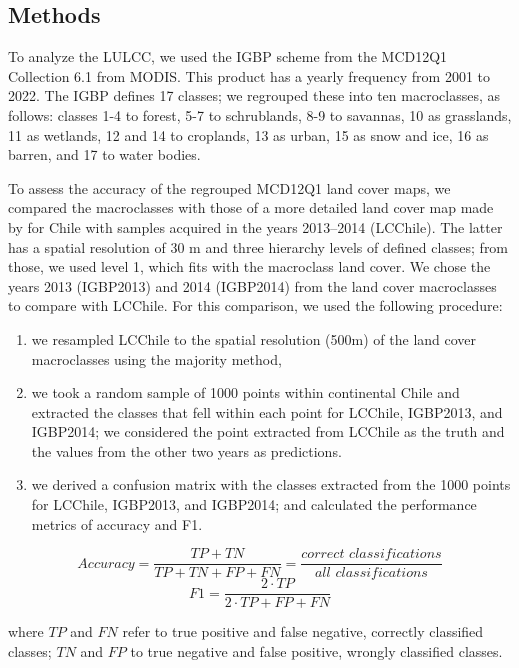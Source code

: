 \documentclass[
  authoryear,
  preprint,
  3p,
  onecolumn]{elsarticle}
\providecommand{\tightlist}{%
  \setlength{\itemsep}{0pt}\setlength{\parskip}{0pt}}\usepackage{longtable,booktabs,array}
\begin{document}
\hypertarget{methods-1}{%
\subsection{Methods}\label{methods-1}}

To analyze the LULCC, we used the IGBP scheme from the MCD12Q1
Collection 6.1 from MODIS. This product has a yearly frequency from 2001
to 2022. The IGBP defines 17 classes; we regrouped these into ten
macroclasses, as follows: classes 1-4 to forest, 5-7 to schrublands, 8-9
to savannas, 10 as grasslands, 11 as wetlands, 12 and 14 to croplands,
13 as urban, 15 as snow and ice, 16 as barren, and 17 to water bodies.

To assess the accuracy of the regrouped MCD12Q1 land cover maps, we
compared the macroclasses with those of a more detailed land cover map
made by \citet{Zhao2016} for Chile with samples acquired in the years
2013--2014 (LCChile). The latter has a spatial resolution of 30 m and
three hierarchy levels of defined classes; from those, we used level 1,
which fits with the macroclass land cover. We chose the years 2013
(IGBP2013) and 2014 (IGBP2014) from the land cover macroclasses to
compare with LCChile. For this comparison, we used the following
procedure:

\begin{enumerate}
\def\labelenumi{\roman{enumi})}
\tightlist
\item
  we resampled LCChile to the spatial resolution (500m) of the land
  cover macroclasses using the majority method,
\item
  we took a random sample of 1000 points within continental Chile and
  extracted the classes that fell within each point for LCChile,
  IGBP2013, and IGBP2014; we considered the point extracted from LCChile
  as the truth and the values from the other two years as predictions.
\item
  we derived a confusion matrix with the classes extracted from the 1000
  points for LCChile, IGBP2013, and IGBP2014; and calculated the
  performance metrics of accuracy and F1.
\end{enumerate}

\[Accuracy = \frac{TP+TN}{TP+TN+FP+FN}=\frac{correct\,\, classifications}{all\,\, classifications}\]
\[F1=\frac{2\cdot TP}{2\cdot TP + FP +FN}\]

where \(TP\) and \(FN\) refer to true positive and false negative,
correctly classified classes; \(TN\) and \(FP\) to true negative and
false positive, wrongly classified classes.
\end{document}
